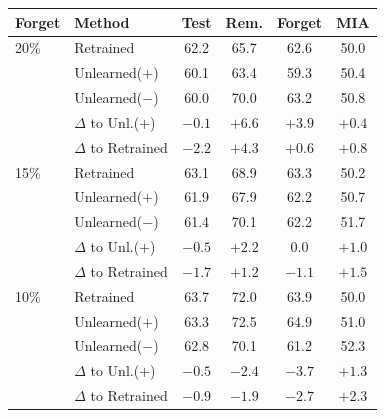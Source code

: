 {\footnotesize\setlength{\tabcolsep}{3pt}
\begin{tabular}{@{}llcccc@{}}
\toprule
Forget & Method & Test & Rem. & Forget & MIA \\
\midrule
20\% & Retrained & 62.2 & 65.7 & 62.6 & 50.0 \\
 & Unlearned($+$) & 60.1 & 63.4 & 59.3 & 50.4 \\
 & Unlearned($-$) & 60.0 & 70.0 & 63.2 & 50.8 \\
 & \quad $\Delta$ to Unl.($+$) & $-0.1$ & $+6.6$ & $+3.9$ & $+0.4$ \\
 & \quad $\Delta$ to Retrained & $-2.2$ & $+4.3$ & $+0.6$ & $+0.8$ \\
\midrule
15\% & Retrained & 63.1 & 68.9 & 63.3 & 50.2 \\
 & Unlearned($+$) & 61.9 & 67.9 & 62.2 & 50.7 \\
 & Unlearned($-$) & 61.4 & 70.1 & 62.2 & 51.7 \\
 & \quad $\Delta$ to Unl.($+$) & $-0.5$ & $+2.2$ & 0.0 & $+1.0$ \\
 & \quad $\Delta$ to Retrained & $-1.7$ & $+1.2$ & $-1.1$ & $+1.5$ \\
\midrule
10\% & Retrained & 63.7 & 72.0 & 63.9 & 50.0 \\
 & Unlearned($+$) & 63.3 & 72.5 & 64.9 & 51.0 \\
 & Unlearned($-$) & 62.8 & 70.1 & 61.2 & 52.3 \\
 & \quad $\Delta$ to Unl.($+$) & $-0.5$ & $-2.4$ & $-3.7$ & $+1.3$ \\
 & \quad $\Delta$ to Retrained & $-0.9$ & $-1.9$ & $-2.7$ & $+2.3$ \\
\bottomrule
\end{tabular}}
